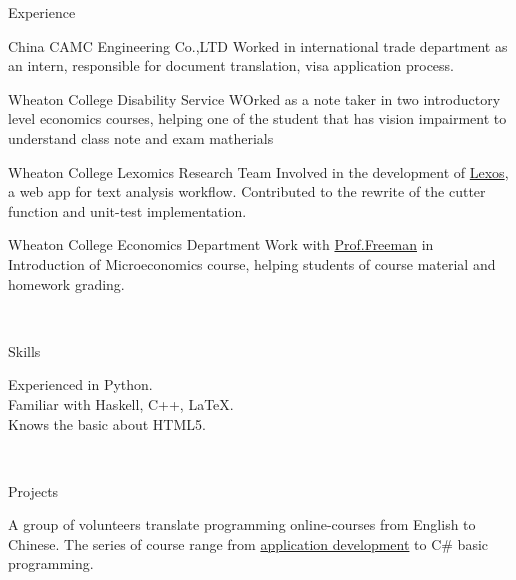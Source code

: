 \documentclass[]{resume-knyte}
\begin{document}
\begin{topic}{Experience}


    {China CAMC Engineering Co.,LTD}
    {Worked in international trade department as an intern, responsible for document translation, visa application process.}

    {Wheaton College Disability Service}
    {WOrked as a note taker in two introductory level economics courses, 
    helping one of the student that has vision impairment to understand class note and exam matherials}

    {Wheaton College Lexomics Research Team}
    {Involved in the development of \href{https://github.com/WheatonCS/Lexos}{Lexos}, a web app for text analysis workflow.
    Contributed to the rewrite of the cutter function and unit-test implementation.}


    {Wheaton College Economics Department}
    {Work with \href{https://wheatoncollege.edu/academics/faculty-directory/james-freeman/}{Prof.Freeman}
    in Introduction of Microeconomics course, helping students of course material and homework grading.}

\\ %
\end{topic}


\begin{topic}{Skills}


    {Experienced in Python.\\
    Familiar with Haskell, C++, \LaTeX{}.\\
    Knows the basic about HTML5.}

    \\ %
\end{topic}


\begin{topic}{Projects}


    {A group of volunteers translate programming online-courses from English to Chinese. 
    The series of course range from \href{https://github.com/chantisnake/AbsoluteBeginnersWin10}{application development} to C# basic programming.}

\end{topic}
\end{document}
